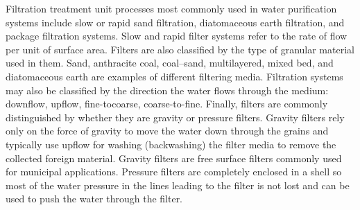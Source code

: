 Filtration treatment unit processes most commonly used in water purification systems include slow or rapid sand filtration, diatomaceous earth filtration, and package filtration systems. Slow and rapid filter systems refer to the rate of flow per unit of surface area. Filters are also classified by the type of granular material used in them. Sand, anthracite coal, coal–sand, multilayered, mixed bed, and diatomaceous earth are examples of different filtering media. Filtration systems may also be classified by the direction the water flows through the medium: downflow, upflow, fine-tocoarse, coarse-to-fine. Finally, filters are commonly distinguished by whether they are gravity or pressure filters. Gravity filters rely only on the force of gravity to move the water down through the grains and typically use upflow for washing (backwashing) the filter media to remove the collected foreign material. Gravity filters are free surface filters commonly used for municipal applications. Pressure filters are completely enclosed in a shell so most of the water pressure in the lines leading to the filter is not lost and can be used to push the water through the filter.\\

